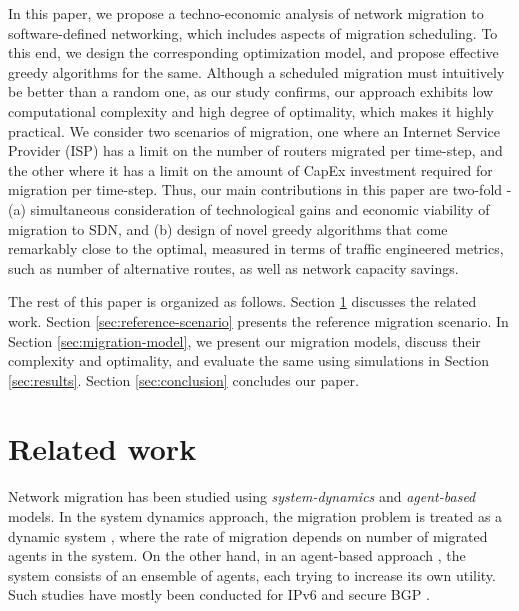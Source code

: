 \documentclass[conference]{IEEEtran}
\begin{document}
\par In this paper, we propose a techno-economic analysis of network migration
to software-defined networking, which includes aspects of migration scheduling.
To this end, we design the corresponding optimization model, and propose
effective greedy algorithms for the same. Although a scheduled migration must
intuitively be better than a random one, as our study confirms, our approach
exhibits low computational complexity and high degree of optimality, which makes
it highly practical. We consider two scenarios of migration, one where an
Internet Service Provider (ISP) has a limit on the number of routers migrated
per time-step, and the other where it has a limit on the amount of CapEx
investment required for migration per time-step. Thus, our main contributions in
this paper are two-fold - (a) simultaneous consideration of technological gains
and economic viability of migration to SDN, and (b) design of novel greedy
algorithms that come remarkably close to the optimal, measured in terms of
traffic engineered metrics, such as number of alternative routes, as well as
network capacity savings.

\par The rest of this paper is organized as follows. Section
\ref{sec:related-work-contri} discusses the related work.
Section \ref{sec:reference-scenario} presents the reference migration scenario.
In Section \ref{sec:migration-model}, we present our migration models, discuss
their complexity and optimality, and evaluate the same using simulations in
Section \ref{sec:results}.
Section \ref{sec:conclusion} concludes our paper.

\section{Related work}\label{sec:related-work-contri}
Network migration has been studied using \emph{system-dynamics} and
\emph{agent-based} models. In the system dynamics approach, the migration
problem is treated as a dynamic system \cite{Sen10}, where the rate of
migration depends on number of migrated agents in the system. On
the other hand, in an agent-based approach \cite{Macy02}, the system consists of
an ensemble of agents, each trying to increase its own utility. Such studies
have mostly been conducted for IPv6 \cite{Trinh10} and secure BGP \cite{Gill11}.
\end{document}
